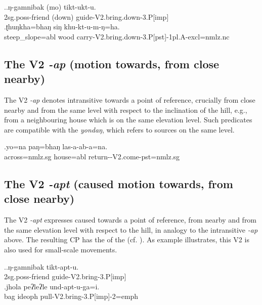 \ex.\ag.ŋ-gamnibak (mo) tikt-ukt-u.\\
{\sc 2sg.poss-}friend (down) guide{\sc -V2.bring.down-3.P[imp]}\\
\bg.ʈhuŋkha=bhaŋ siŋ khu-kt-u-m-ŋ=ha.\\
steep\_slope{\sc =abl} wood carry{\sc -V2.bring.down-3.P[pst]-1pl.A-excl=nmlz.nc}\\


\subsection{The V2 \emph{-ap} (motion towards, from close nearby)} \label{V2-come}

The V2 \emph{-ap}  denotes intransitive  towards a point of reference, crucially from close nearby and from the same  level with respect to the inclination of the hill, e.g., from a neighbouring house which is on the same elevation level. Such predicates are compatible with the  \emph{yondaŋ}, which refers to sources on the same level.

\exg.yo=na paŋ=bhaŋ las-a-ab-a=na.\\
across{\sc =nmlz.sg} house{\sc =abl} return-{\sc [3sg]-V2.come-pst=nmlz.sg}\\


\subsection{The V2 \emph{-apt} (caused motion towards, from close nearby)} \label{V2-bring}%

The V2 \emph{-apt}   expresses caused  towards  a point of reference, from nearby and from the same elevation level with respect to the hill, in analogy to the intransitive \emph{-ap} above. The resulting CP has the  of the  (cf. ). As example \Next[b] illustrates, this V2 is also used for small-scale movements.

\ex.\ag.ŋ-gamnibak tikt-apt-u.\\
{\sc 2sg.poss-}friend  guide{\sc -V2.bring-3.P[imp]}\\
\bg.jhola peʔleʔle und-apt-u-ga=i.\\
bag {\sc ideoph} pull{\sc -V2.bring-3.P[imp]-2=emph}\\


